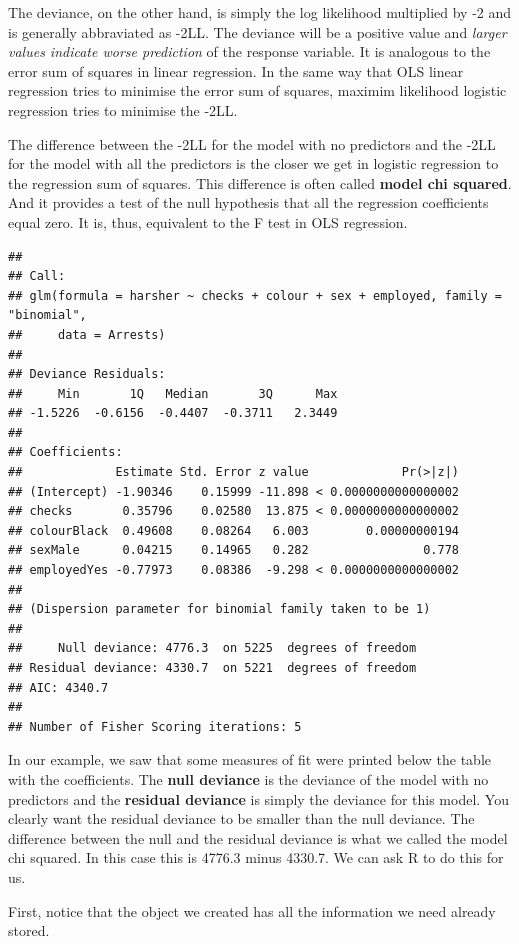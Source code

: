 \documentclass[
]{book}
\begin{document}
The deviance, on the other hand, is simply the log likelihood multiplied by -2 and is generally abbraviated as -2LL. The deviance will be a positive value and \emph{larger values indicate worse prediction} of the response variable. It is analogous to the error sum of squares in linear regression. In the same way that OLS linear regression tries to minimise the error sum of squares, maximim likelihood logistic regression tries to minimise the -2LL.

The difference between the -2LL for the model with no predictors and the -2LL for the model with all the predictors is the closer we get in logistic regression to the regression sum of squares. This difference is often called \textbf{model chi squared}. And it provides a test of the null hypothesis that all the regression coefficients equal zero. It is, thus, equivalent to the F test in OLS regression.

\begin{verbatim}
## 
## Call:
## glm(formula = harsher ~ checks + colour + sex + employed, family = "binomial", 
##     data = Arrests)
## 
## Deviance Residuals: 
##     Min       1Q   Median       3Q      Max  
## -1.5226  -0.6156  -0.4407  -0.3711   2.3449  
## 
## Coefficients:
##             Estimate Std. Error z value             Pr(>|z|)
## (Intercept) -1.90346    0.15999 -11.898 < 0.0000000000000002
## checks       0.35796    0.02580  13.875 < 0.0000000000000002
## colourBlack  0.49608    0.08264   6.003        0.00000000194
## sexMale      0.04215    0.14965   0.282                0.778
## employedYes -0.77973    0.08386  -9.298 < 0.0000000000000002
## 
## (Dispersion parameter for binomial family taken to be 1)
## 
##     Null deviance: 4776.3  on 5225  degrees of freedom
## Residual deviance: 4330.7  on 5221  degrees of freedom
## AIC: 4340.7
## 
## Number of Fisher Scoring iterations: 5
\end{verbatim}

In our example, we saw that some measures of fit were printed below the table with the coefficients. The \textbf{null deviance} is the deviance of the model with no predictors and the \textbf{residual deviance} is simply the deviance for this model. You clearly want the residual deviance to be smaller than the null deviance. The difference between the null and the residual deviance is what we called the model chi squared. In this case this is 4776.3 minus 4330.7. We can ask R to do this for us.

First, notice that the object we created has all the information we need already stored.
\end{document}
